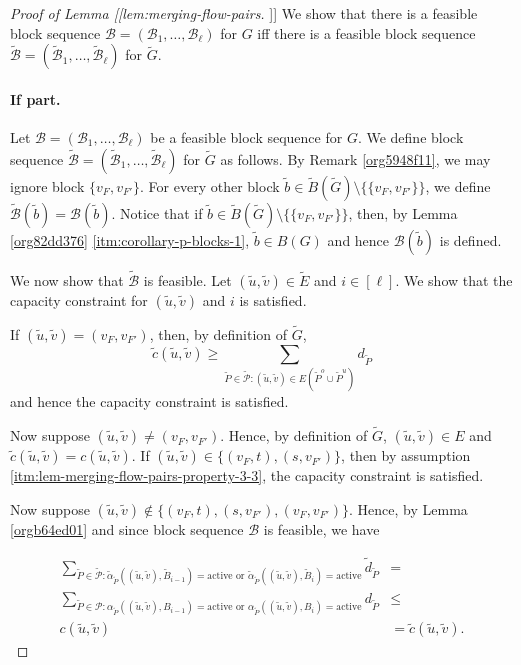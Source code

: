 \documentclass[fontsize=11pt,paper=a4]{book}
\begin{document}
\begin{proof}[Proof of Lemma [[lem:merging-flow-pairs]]]
We show that there is a feasible block sequence \(\mathcal{B}=(\mathscr{B}_1,\dots,\mathscr{B}_{\ell})\) for \(G\) iff there is a feasible block sequence \(\tilde{\mathcal{B}}=(\tilde{\mathscr{B}}_1,\dots,\tilde{\mathscr{B}}_{\ell})\) for \(\tilde{G}\).

\paragraph{If part.}
Let \(\mathcal{B}=(\mathscr{B}_1,\dots,\mathscr{B}_{\ell})\) be a feasible block sequence for \(G\).
We define block sequence \(\tilde{\mathcal{B}}=(\tilde{\mathscr{B}}_1,\dots,\tilde{\mathscr{B}}_{\ell})\) for \(\tilde{G}\) as follows.
By Remark \ref{org5948f11}, we may ignore block \(\{v_F,v_{F'}\}\).
For every other block \(\tilde{b}\in\tilde{B}(\tilde{G})\setminus\{\{v_F,v_{F'}\}\}\), we define \(\tilde{\mathcal{B}}(\tilde{b})=\mathcal{B}(\tilde{b})\).
Notice that if \(\tilde{b}\in\tilde{B}(\tilde{G})\setminus\{\{v_F,v_{F'}\}\}\), then, by Lemma \ref{org82dd376} \ref{itm:corollary-p-blocks-1}, \(\tilde{b}\in B(G)\) and hence \(\mathcal{B}(\tilde{b})\) is defined.

We now show that \(\tilde{\mathcal{B}}\) is feasible.
Let \((\tilde{u},\tilde{v})\in\tilde{E}\) and \(i\in[\ell]\).
We show that the capacity constraint for \((\tilde{u},\tilde{v})\) and \(i\) is satisfied.

If \((\tilde{u},\tilde{v})=(v_F,v_{F'})\), then, by definition of \(\tilde{G}\),
\[
\tilde{c}(\tilde{u},\tilde{v})\geq\sum_{\tilde{P}\in\tilde{\mathcal{P}}:(\tilde{u},\tilde{v})\in E(\tilde{P}^o\cup\tilde{P}^u)}d_{\tilde{P}}
\]
and hence the capacity constraint is satisfied.

Now suppose \((\tilde{u},\tilde{v})\neq(v_F,v_{F'})\).
Hence, by definition of \(\tilde{G}\), \((\tilde{u},\tilde{v})\in E\) and \(\tilde{c}(\tilde{u},\tilde{v})=c(\tilde{u},\tilde{v})\).
If \((\tilde{u},\tilde{v})\in\{(v_F,t),(s,v_{F'})\}\), then by assumption \ref{itm:lem-merging-flow-pairs-property-3-3}, the capacity constraint is satisfied.

Now suppose \((\tilde{u},\tilde{v})\notin\{(v_F,t),(s,v_{F'}),(v_F,v_{F'})\}\).
Hence, by Lemma \ref{orgb64ed01} and since block sequence \(\mathcal{B}\) is feasible, we have

\begin{align*}
\sum_{\tilde{P}\in\tilde{\mathcal{P}}:\tilde{\alpha}_{\tilde{P}}((\tilde{u},\tilde{v}),\tilde{B}_{i-1})=\mathrm{active}\text{ or }\tilde{\alpha}_{\tilde{P}}((\tilde{u},\tilde{v}),\tilde{B}_i)=\mathrm{active}}\tilde{d}_{\tilde{P}}&=\\
\sum_{\tilde{P}\in\mathcal{P}:\alpha_{\tilde{P}}((\tilde{u},\tilde{v}),B_{i-1})=\mathrm{active}\text{ or }\alpha_{\tilde{P}}((\tilde{u},\tilde{v}),B_i)=\mathrm{active}}d_{\tilde{P}}&\leq\\
c(\tilde{u},\tilde{v})&=
\tilde{c}(\tilde{u},\tilde{v}).
\end{align*}


\end{proof}
\end{document}
